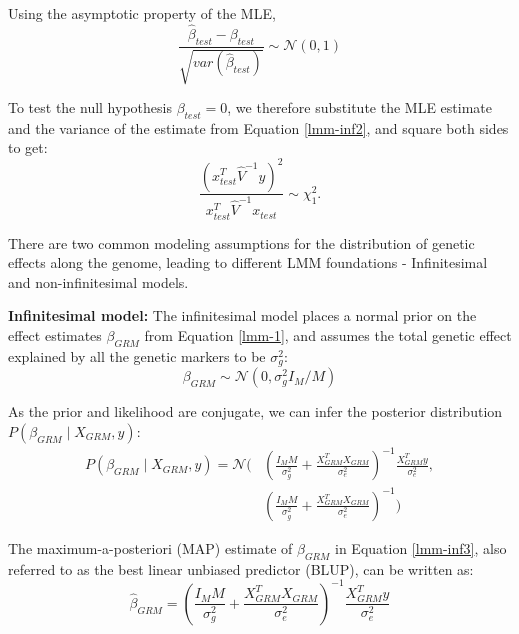 %
Using the asymptotic property of the MLE, 
\begin{equation}
   \frac{\hat{\beta}_{test} - \beta_{test}}{\sqrt{var(\hat{\beta}_{test})}} \sim \mathcal{N}(0, 1) 
\end{equation}

%
To test the null hypothesis $\beta_{test} = 0$, we therefore substitute the MLE estimate and the variance of the estimate from Equation \ref{lmm-inf2}, and square both sides to get:
\begin{equation}
   \frac{(x_{test}^T \hat{V}^{-1} y)^2}{x_{test}^T \hat{V}^{-1} x_{test}} \sim \chi^2_1 \label{lmm-chi2-rep}.
\end{equation}


There are two common modeling assumptions for the distribution of genetic effects along the genome, leading to different LMM foundations - Infinitesimal and non-infinitesimal models. 

%
\textbf{Infinitesimal model: }
%
The infinitesimal model places a normal prior on the effect estimates $\beta_{GRM}$ from Equation \ref{lmm-1}, and assumes the total genetic effect explained by all the genetic markers to be $\sigma_g^2$:
\begin{equation}
    \beta_{GRM} \sim \mathcal{N}(0, \sigma_g^2 I_M/M)
\end{equation}

%
As the prior and likelihood are conjugate, we can infer the posterior distribution $P(\beta_{GRM} \mid X_{GRM}, y)$:
\begin{equation}
    \begin{split}
        P(\beta_{GRM} \mid X_{GRM}, y) = \mathcal{N}\Bigg( &\left( \frac{I_M M}{\sigma_g^2} + \frac{X_{GRM}^T X_{GRM}}{\sigma_e^2} \right) ^{-1} \frac{X_{GRM}^T y}{\sigma_e^2}, \\
        &\left( \frac{I_M M}{\sigma_g^2} + \frac{X_{GRM}^T X_{GRM}}{\sigma_e^2} \right) ^{-1} \Bigg) \label{lmm-inf3}
    \end{split}
\end{equation}

%
The maximum-a-posteriori (MAP) estimate of $\beta_{GRM}$ in Equation \ref{lmm-inf3}, also referred to as the best linear unbiased predictor (BLUP), can be written as:
\begin{equation}
    \hat{\beta}_{GRM} = \left( \frac{I_M M}{\sigma_g^2} + \frac{X_{GRM}^T X_{GRM}}{\sigma_e^2} \right) ^{-1} \frac{X_{GRM}^T y}{\sigma_e^2} 
\end{equation}

